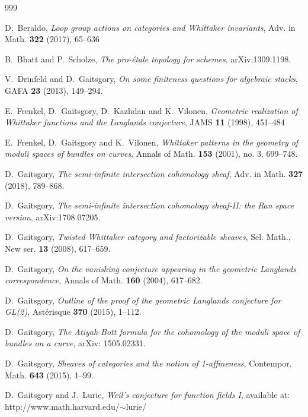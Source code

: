 \documentclass[9pt]{amsart}
\theoremstyle{definition}
\theoremstyle{remark}
\numberwithin{equation}{section}
\begin{document}
\begin{thebibliography}{999}

 D.~Beraldo, {\it Loop group actions on categories and Whittaker invariants}, 
Adv. in Math. {\bf 322} (2017), 65--636

 B.~Bhatt and P.~Scholze, {\it The pro-\'etale topology for schemes}, arXiv:1309.1198. 

 V.~Drinfeld and D.~Gaitsgory, {\it On some finiteness questions for algebraic stacks}, GAFA {\bf 23} (2013), 149--294.

 E.~Frenkel, D.~Gaitsgory, D.~Kazhdan and K.~Vilonen, {\it Geometric realization of Whittaker functions 
and the Langlands conjecture}, JAMS {\bf 11} (1998), 451--484

 E.~Frenkel, D.~Gaitsgory and K.~Vilonen, {\it Whittaker patterns in the geometry of moduli spaces of bundles on curves},  
Annals of Math. {\bf 153} (2001), no. 3, 699--748.

 D.~Gaitsgory, {\it The semi-infinite intersection cohomology sheaf}, Adv. in Math. {\bf 327} (2018), 789--868. 

 D.~Gaitsgory, {\it The semi-infinite intersection cohomology sheaf-II: the Ran space version}, arXiv:1708.07205.

 D.~Gaitsgory, {\it Twisted Whittaker category and factorizable sheaves}, Sel. Math., New ser. {\bf 13} (2008), 617--659.

 D.~Gaitsgory, {\it On the vanishing conjecture appearing in the geometric Langlands correspondence}, 
Annals of Math. {\bf 160} (2004), 617--682.

 D.~Gaitsgory, {\it Outline of the proof of the geometric Langlands conjecture for GL(2)}, 
Ast\'erisque {\bf 370} (2015), 1--112. 

 D.~Gaitsgory, {\it The Atiyah-Bott formula for the cohomology of the moduli space of bundles on a curve}, 
arXiv: 1505.02331.

 D.~Gaitsgory, {\it Sheaves of categories and the notion of 1-affineness}, 
Contempor. Math. {\bf 643} (2015), 1--99.

  D.~Gaitsgory and J.~Lurie, {\it Weil's conjecture for function fields I}, \hfill \newline
available at: http://www.math.harvard.edu/$\sim$lurie/


\end{thebibliography}
\end{document}
